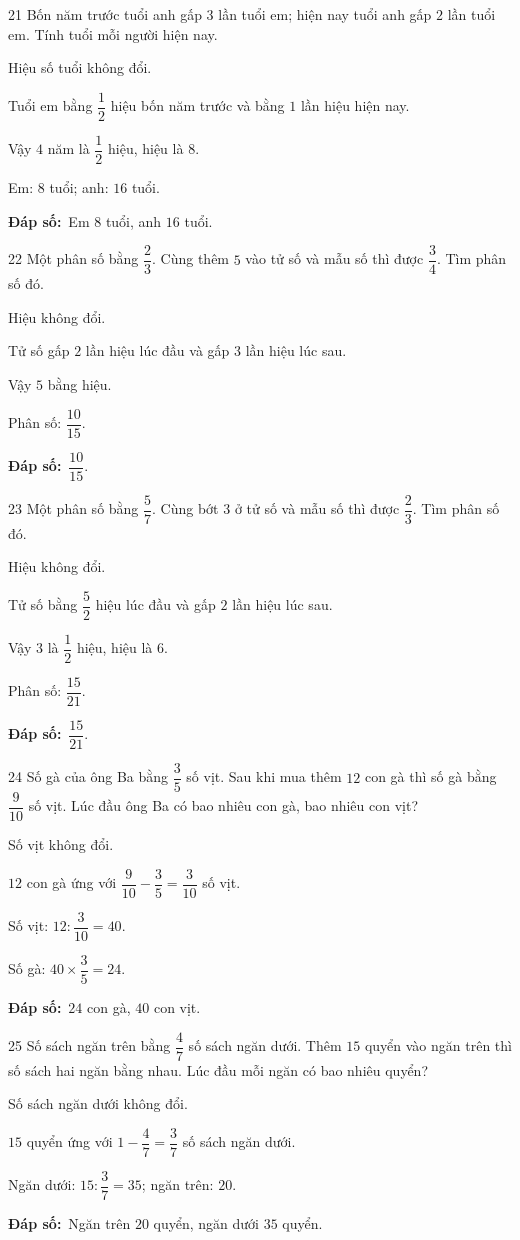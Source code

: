 \documentclass[11pt]{article}
\newif\ifsol \solfalse
\providecommand{\AnsWord}{Đáp số}
\newcommand{\dapso}[1]{\par\textbf{\AnsWord:}\ #1}
\newcommand{\probsol}[1]{%
  \begin{lrbox}{\solmeasure}\begin{minipage}{\dimexpr\linewidth-24pt\relax}#1\end{minipage}\end{lrbox}%
  \ifsol
    \begin{solbox}#1\end{solbox}%
  \else
    \setlength{\solht}{\dimexpr\ht\solmeasure+\dp\solmeasure+0.85cm\relax}%
    \ifdim\solht<1.35cm\setlength{\solht}{1.35cm}\fi
    \begin{tcolorbox}[colback=white,colframe=Line,boxrule=0.8pt,arc=5pt,
      left=8pt,right=8pt,top=4pt,bottom=4pt,height=\solht]{\footnotesize\color{Slate}\itshape\WorkWord}\end{tcolorbox}%
  \fi}
\newcommand{\gap}{\vspace{0.3cm}}
\def\WorkWord{Bài làm:}
\def\AnsWord{Đáp số}
\begin{document}
\gap
\begin{probbox}{21}{\relax}
Bốn năm trước tuổi anh gấp $3$ lần tuổi em; hiện nay tuổi anh gấp $2$ lần tuổi em. Tính tuổi mỗi người hiện nay.
\end{probbox}
\probsol{
Hiệu số tuổi không đổi.\par Tuổi em bằng $\dfrac12$ hiệu bốn năm trước và bằng $1$ lần hiệu hiện nay.\par Vậy $4$ năm là $\dfrac12$ hiệu, hiệu là $8$.\par Em: $8$ tuổi; anh: $16$ tuổi.
\dapso{Em $8$ tuổi, anh $16$ tuổi.}}
\gap
\begin{probbox}{22}{\relax}
Một phân số bằng $\dfrac23$. Cùng thêm $5$ vào tử số và mẫu số thì được $\dfrac34$. Tìm phân số đó.
\end{probbox}
\probsol{
Hiệu không đổi.\par Tử số gấp $2$ lần hiệu lúc đầu và gấp $3$ lần hiệu lúc sau.\par Vậy $5$ bằng hiệu.\par Phân số: $\dfrac{10}{15}$.
\dapso{$\dfrac{10}{15}$.}}
\gap
\begin{probbox}{23}{\relax}
Một phân số bằng $\dfrac57$. Cùng bớt $3$ ở tử số và mẫu số thì được $\dfrac23$. Tìm phân số đó.
\end{probbox}
\probsol{
Hiệu không đổi.\par Tử số bằng $\dfrac52$ hiệu lúc đầu và gấp $2$ lần hiệu lúc sau.\par Vậy $3$ là $\dfrac12$ hiệu, hiệu là $6$.\par Phân số: $\dfrac{15}{21}$.
\dapso{$\dfrac{15}{21}$.}}
\gap
\begin{probbox}{24}{\relax}
Số gà của ông Ba bằng $\dfrac35$ số vịt. Sau khi mua thêm $12$ con gà thì số gà bằng $\dfrac9{10}$ số vịt. Lúc đầu ông Ba có bao nhiêu con gà, bao nhiêu con vịt?
\end{probbox}
\probsol{
Số vịt không đổi.\par $12$ con gà ứng với $\dfrac9{10}-\dfrac35=\dfrac3{10}$ số vịt.\par Số vịt: $12:\dfrac3{10}=40$.\par Số gà: $40\times\dfrac35=24$.
\dapso{$24$ con gà, $40$ con vịt.}}
\gap
\begin{probbox}{25}{\relax}
Số sách ngăn trên bằng $\dfrac47$ số sách ngăn dưới. Thêm $15$ quyển vào ngăn trên thì số sách hai ngăn bằng nhau. Lúc đầu mỗi ngăn có bao nhiêu quyển?
\end{probbox}
\probsol{
Số sách ngăn dưới không đổi.\par $15$ quyển ứng với $1-\dfrac47=\dfrac37$ số sách ngăn dưới.\par Ngăn dưới: $15:\dfrac37=35$; ngăn trên: $20$.
\dapso{Ngăn trên $20$ quyển, ngăn dưới $35$ quyển.}}
\end{document}
